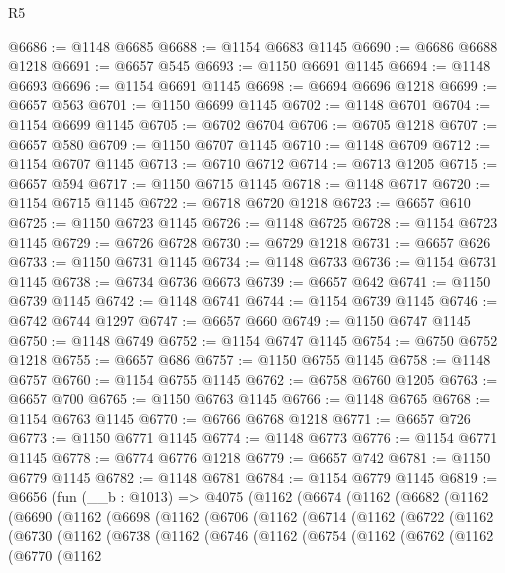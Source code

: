 \begin{lexlean}{R5}
\begin{coremodule}
@6686 := @1148 @6685
@6688 := @1154 @6683 @1145
@6690 := @6686 @6688 @1218
@6691 := @6657 @545
@6693 := @1150 @6691 @1145
@6694 := @1148 @6693
@6696 := @1154 @6691 @1145
@6698 := @6694 @6696 @1218
@6699 := @6657 @563
@6701 := @1150 @6699 @1145
@6702 := @1148 @6701
@6704 := @1154 @6699 @1145
@6705 := @6702 @6704
@6706 := @6705 @1218
@6707 := @6657 @580
@6709 := @1150 @6707 @1145
@6710 := @1148 @6709
@6712 := @1154 @6707 @1145
@6713 := @6710 @6712
@6714 := @6713 @1205
@6715 := @6657 @594
@6717 := @1150 @6715 @1145
@6718 := @1148 @6717
@6720 := @1154 @6715 @1145
@6722 := @6718 @6720 @1218
@6723 := @6657 @610
@6725 := @1150 @6723 @1145
@6726 := @1148 @6725
@6728 := @1154 @6723 @1145
@6729 := @6726 @6728
@6730 := @6729 @1218
@6731 := @6657 @626
@6733 := @1150 @6731 @1145
@6734 := @1148 @6733
@6736 := @1154 @6731 @1145
@6738 := @6734 @6736 @6673
@6739 := @6657 @642
@6741 := @1150 @6739 @1145
@6742 := @1148 @6741
@6744 := @1154 @6739 @1145
@6746 := @6742 @6744 @1297
@6747 := @6657 @660
@6749 := @1150 @6747 @1145
@6750 := @1148 @6749
@6752 := @1154 @6747 @1145
@6754 := @6750 @6752 @1218
@6755 := @6657 @686
@6757 := @1150 @6755 @1145
@6758 := @1148 @6757
@6760 := @1154 @6755 @1145
@6762 := @6758 @6760 @1205
@6763 := @6657 @700
@6765 := @1150 @6763 @1145
@6766 := @1148 @6765
@6768 := @1154 @6763 @1145
@6770 := @6766 @6768 @1218
@6771 := @6657 @726
@6773 := @1150 @6771 @1145
@6774 := @1148 @6773
@6776 := @1154 @6771 @1145
@6778 := @6774 @6776 @1218
@6779 := @6657 @742
@6781 := @1150 @6779 @1145
@6782 := @1148 @6781
@6784 := @1154 @6779 @1145
@6819 := @6656
    (fun (__b : @1013) =>
    @4075
      (@1162
        (@6674
          (@1162
            (@6682
              (@1162
                (@6690
                  (@1162
                    (@6698
                      (@1162
                        (@6706
                          (@1162
                            (@6714
                              (@1162
                                (@6722
                                  (@1162
                                    (@6730
                                      (@1162
                                        (@6738
                                          (@1162
                                            (@6746
                                              (@1162
                                                (@6754
                                                  (@1162
                                                    (@6762
                                                      (@1162
                                                        (@6770
                                                          (@1162

\end{coremodule}
\end{lexlean}
